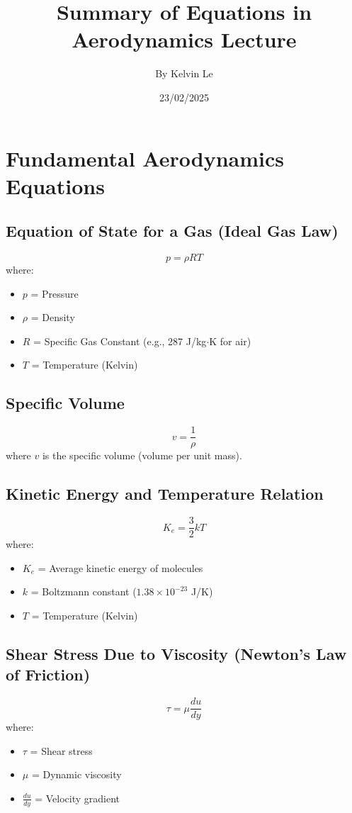 \documentclass{article}
\begin{document}
\title{Summary of Equations in Aerodynamics Lecture}
\author{By Kelvin Le}
\date{23/02/2025}
\maketitle

\section{Fundamental Aerodynamics Equations}

\subsection{Equation of State for a Gas (Ideal Gas Law)}
\begin{equation}
    p = \rho R T
\end{equation}
where:
\begin{itemize}
    \item $p$ = Pressure
    \item $\rho$ = Density
    \item $R$ = Specific Gas Constant (e.g., 287 J/kg$\cdot$K for air)
    \item $T$ = Temperature (Kelvin)
\end{itemize}

\subsection{Specific Volume}
\begin{equation}
    v = \frac{1}{\rho}
\end{equation}
where $v$ is the specific volume (volume per unit mass).

\subsection{Kinetic Energy and Temperature Relation}
\begin{equation}
    K_e = \frac{3}{2} k T
\end{equation}
where:
\begin{itemize}
    \item $K_e$ = Average kinetic energy of molecules
    \item $k$ = Boltzmann constant ($1.38 \times 10^{-23}$ J/K)
    \item $T$ = Temperature (Kelvin)
\end{itemize}

\subsection{Shear Stress Due to Viscosity (Newton’s Law of Friction)}
\begin{equation}
    \tau = \mu \frac{du}{dy}
\end{equation}
where:
\begin{itemize}
    \item $\tau$ = Shear stress
    \item $\mu$ = Dynamic viscosity
    \item $\frac{du}{dy}$ = Velocity gradient
\end{itemize}
\end{document}
